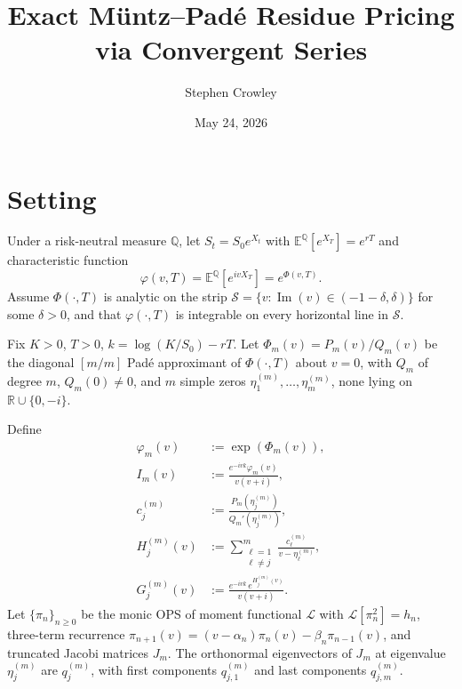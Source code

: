 \documentclass{article}
\newcommand{\R}{\mathbb{R}}
\newcommand{\Q}{\mathbb{Q}}
\newcommand{\E}{\mathbb{E}}
\newcommand{\cL}{\mathcal{L}}
\newcommand{\cS}{\mathcal{S}}
\begin{document}
\title{Exact M\"untz--Pad\'e Residue Pricing\\via Convergent Series}
\author{Stephen Crowley}
\date{May 24, 2026}
\maketitle

\section*{Setting}

Under a risk-neutral measure $\Q$, let $S_t = S_0 e^{X_t}$ with
$\E^{\Q}[e^{X_T}] = e^{rT}$ and characteristic function
\begin{equation}\label{eq:cf}
  \varphi(v,T) = \E^{\Q}[e^{ivX_T}] = e^{\Phi(v,T)}.
\end{equation}
Assume $\Phi(\cdot,T)$ is analytic on the strip
$\cS = \{v : \operatorname{Im}(v) \in (-1-\delta,\delta)\}$ for some
$\delta > 0$, and that $\varphi(\cdot,T)$ is integrable on every
horizontal line in $\cS$.

Fix $K > 0$, $T > 0$, $k = \log(K/S_0) - rT$.
Let $\Phi_m(v) = P_m(v)/Q_m(v)$ be the diagonal $[m/m]$ Pad\'e
approximant of $\Phi(\cdot,T)$ about $v = 0$, with $Q_m$ of degree $m$,
$Q_m(0) \ne 0$, and $m$ simple zeros
$\eta_1^{(m)},\dots,\eta_m^{(m)}$, none lying on
$\R \cup \{0,-i\}$.

Define
\begin{align}
  \varphi_m(v) &:= \exp(\Phi_m(v)),\label{eq:phim}\\
  I_m(v) &:= \frac{e^{-ivk}\varphi_m(v)}{v(v+i)},\label{eq:Im}\\
  c_j^{(m)} &:= \frac{P_m(\eta_j^{(m)})}{Q_m'(\eta_j^{(m)})},\label{eq:cj}\\
  H_j^{(m)}(v) &:= \sum_{\substack{\ell=1\\\ell\ne j}}^{m}
    \frac{c_\ell^{(m)}}{v - \eta_\ell^{(m)}},\label{eq:Hj}\\
  G_j^{(m)}(v) &:= \frac{e^{-ivk}\,e^{H_j^{(m)}(v)}}{v(v+i)}.\label{eq:Gj}
\end{align}
Let $\{\pi_n\}_{n\ge 0}$ be the monic OPS of moment functional $\cL$
with $\cL[\pi_n^2] = h_n$, three-term recurrence
$\pi_{n+1}(v) = (v - \alpha_n)\pi_n(v) - \beta_n\pi_{n-1}(v)$,
and truncated Jacobi matrices $J_m$. The orthonormal eigenvectors of
$J_m$ at eigenvalue $\eta_j^{(m)}$ are $q_j^{(m)}$, with first
components $q_{j,1}^{(m)}$ and last components $q_{j,m}^{(m)}$.
\end{document}

